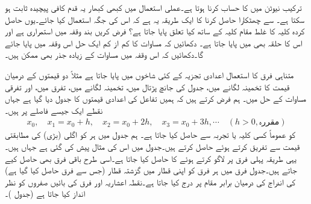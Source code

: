 \quad
ترکیب نیوٹن میں  کا حساب کرنا ہوتا ہے۔عملی استعمال میں کبھی کبھار یہ قدم کافی پیچیدہ ثابت ہو سکتا ہے۔ سے چھٹکارا حاصل کرنا کا ایک طریقہ یہ ہے کہ اس کی جگہ  استعمال کیا جائے۔یوں حاصل کردہ کلیہ کا غلط مقام کلیہ کے ساتھ کیا تعلق پایا جاتا ہے؟
\quad
فرض کریں بند وقفہ  میں  استمراری ہے اور اس کا حلقہ بھی  میں پایا جاتا ہے۔ دکھائیں کہ مساوات  کا کم از کم ایک حل اس وقفہ میں پایا جائے گا۔دکھائیں کہ اس وقفہ میں مساوات کے زیادہ جذر بھی ممکن ہیں۔

متناہی فرق کا استعمال اعدادی تجزیہ کے کئی شاخوں میں پایا جاتا ہے مثلاً دو قیمتوں کے درمیان قیمت کا تخمینہ لگانے میں، جدول کی جانچ پڑتال میں، تخمینہ لگانے میں، تفرق میں، اور تفرقی مساوات کے حل میں۔ ہم فرض کرتے ہیں کہ ہمیں تفاعل  کی اعدادی قیمتوں   کا جدول دیا گیا ہے جہاں نقطے  ایک جیسے  فاصلے پر ہیں۔ 
\begin{align*}
x_0,\quad x_1=x_0+h,\quad x_2=x_0+2h,\quad x_3=x_0+3h,\cdots \quad (h>0, \text{مقررہ})
\end{align*}
 کو عموماً کسی کلیہ یا تجربہ سے حاصل کیا جاتا ہے۔ ہم جدول میں ہر   کو اگلی (بڑی)  کی مطابقتی قیمت سے تفریق کرتے ہوئے  حاصل کرتے ہیں۔جدول  میں اس کی مثال پیش کی گئی ہے جہاں  ہیں۔یہی طریقہ پہلی فرق پر لاگو کرتے ہوئے  کا  حاصل کیا جاتا ہے۔اسی طرح باقی فرق بھی حاصل کیے جاتے ہیں۔جدول فرق میں ہر فرق کو اپنی قطار میں گزشتہ قطار (جس سے فرق حاصل کیا گیا ہے) کی اندراج کی درمیان برابر  مقام پر درج کیا جاتا ہے۔نقطہ اعشاریہ اور فرق کی بائیں صفروں کو نظر انداز کیا جاتا ہے (جدول )۔ 

